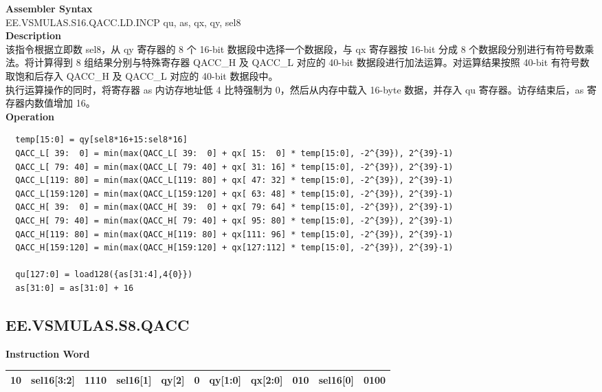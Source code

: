 \textbf{Assembler Syntax} \\
EE.VSMULAS.S16.QACC.LD.INCP qu, as, qx, qy, sel8 \\
\textbf{Description} \\
该指令根据立即数 sel8，从 qy 寄存器的 8 个 16-bit 数据段中选择一个数据段，与 qx 寄存器按 16-bit 分成 8 个数据段分别进行有符号数乘法。将计算得到 8 组结果分别与特殊寄存器 QACC\_H 及 QACC\_L 对应的 40-bit 数据段进行加法运算。对运算结果按照 40-bit 有符号数取饱和后存入 QACC\_H 及 QACC\_L 对应的 40-bit 数据段中。\\
执行运算操作的同时，将寄存器 as 内访存地址低 4 比特强制为 0，然后从内存中载入 16-byte 数据，并存入 qu 寄存器。访存结束后，as 寄存器内数值增加 16。\\
\textbf{Operation}
\begin{lstlisting}
  temp[15:0] = qy[sel8*16+15:sel8*16]
  QACC_L[ 39:  0] = min(max(QACC_L[ 39:  0] + qx[ 15:  0] * temp[15:0], -2^{39}), 2^{39}-1)
  QACC_L[ 79: 40] = min(max(QACC_L[ 79: 40] + qx[ 31: 16] * temp[15:0], -2^{39}), 2^{39}-1)
  QACC_L[119: 80] = min(max(QACC_L[119: 80] + qx[ 47: 32] * temp[15:0], -2^{39}), 2^{39}-1)
  QACC_L[159:120] = min(max(QACC_L[159:120] + qx[ 63: 48] * temp[15:0], -2^{39}), 2^{39}-1)
  QACC_H[ 39:  0] = min(max(QACC_H[ 39:  0] + qx[ 79: 64] * temp[15:0], -2^{39}), 2^{39}-1)
  QACC_H[ 79: 40] = min(max(QACC_H[ 79: 40] + qx[ 95: 80] * temp[15:0], -2^{39}), 2^{39}-1)
  QACC_H[119: 80] = min(max(QACC_H[119: 80] + qx[111: 96] * temp[15:0], -2^{39}), 2^{39}-1)
  QACC_H[159:120] = min(max(QACC_H[159:120] + qx[127:112] * temp[15:0], -2^{39}), 2^{39}-1)

  qu[127:0] = load128({as[31:4],4{0}})
  as[31:0] = as[31:0] + 16
\end{lstlisting}

\clearpage
\subsection{EE.VSMULAS.S8.QACC}\label{instruction:EEVSMULASS8QACC}
\setlength\tabcolsep{6pt}
\textbf{Instruction Word} \\
\begin{tabular}{|c|c|c|c|c|c|c|c|c|c|c|}
	\hline
	10 & sel16[3:2] & 1110 & sel16[1] & qy[2] & 0 & qy[1:0] & qx[2:0] & 010 & sel16[0] & 0100 \\
	\hline
\end{tabular}

